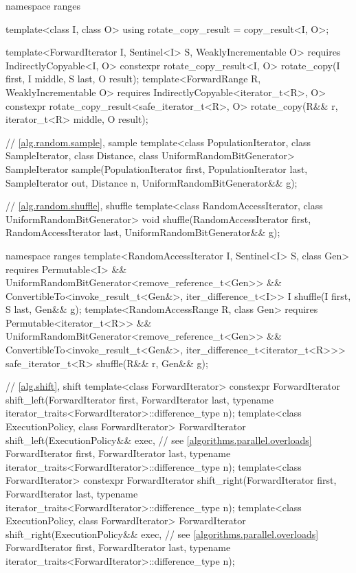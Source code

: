 \begin{codeblock}
{  namespace ranges {
    template<class I, class O>
    using rotate_copy_result = copy_result<I, O>;

    template<ForwardIterator I, Sentinel<I> S, WeaklyIncrementable O>
      requires IndirectlyCopyable<I, O>
      constexpr rotate_copy_result<I, O>
        rotate_copy(I first, I middle, S last, O result);
    template<ForwardRange R, WeaklyIncrementable O>
      requires IndirectlyCopyable<iterator_t<R>, O>
      constexpr rotate_copy_result<safe_iterator_t<R>, O>
        rotate_copy(R&& r, iterator_t<R> middle, O result);
  }

  // \ref{alg.random.sample}, sample
  template<class PopulationIterator, class SampleIterator,
           class Distance, class UniformRandomBitGenerator>
    SampleIterator sample(PopulationIterator first, PopulationIterator last,
                          SampleIterator out, Distance n,
                          UniformRandomBitGenerator&& g);

  // \ref{alg.random.shuffle}, shuffle
  template<class RandomAccessIterator, class UniformRandomBitGenerator>
    void shuffle(RandomAccessIterator first,
                 RandomAccessIterator last,
                 UniformRandomBitGenerator&& g);

  namespace ranges {
    template<RandomAccessIterator I, Sentinel<I> S, class Gen>
      requires Permutable<I> &&
               UniformRandomBitGenerator<remove_reference_t<Gen>> &&
               ConvertibleTo<invoke_result_t<Gen&>, iter_difference_t<I>>
      I shuffle(I first, S last, Gen&& g);
    template<RandomAccessRange R, class Gen>
      requires Permutable<iterator_t<R>> &&
               UniformRandomBitGenerator<remove_reference_t<Gen>> &&
               ConvertibleTo<invoke_result_t<Gen&>, iter_difference_t<iterator_t<R>>>
      safe_iterator_t<R> shuffle(R&& r, Gen&& g);
  }

  // \ref{alg.shift}, shift
  template<class ForwardIterator>
    constexpr ForwardIterator
      shift_left(ForwardIterator first, ForwardIterator last,
                 typename iterator_traits<ForwardIterator>::difference_type n);
  template<class ExecutionPolicy, class ForwardIterator>
    ForwardIterator
      shift_left(ExecutionPolicy&& exec, // see \ref{algorithms.parallel.overloads}
                 ForwardIterator first, ForwardIterator last,
                 typename iterator_traits<ForwardIterator>::difference_type n);
  template<class ForwardIterator>
    constexpr ForwardIterator
      shift_right(ForwardIterator first, ForwardIterator last,
                  typename iterator_traits<ForwardIterator>::difference_type n);
  template<class ExecutionPolicy, class ForwardIterator>
    ForwardIterator
      shift_right(ExecutionPolicy&& exec, // see \ref{algorithms.parallel.overloads}
                  ForwardIterator first, ForwardIterator last,
                  typename iterator_traits<ForwardIterator>::difference_type n);

}
\end{codeblock}
